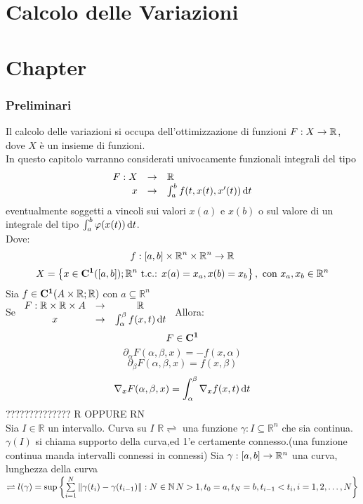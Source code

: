 \part{Calcolo delle Variazioni}
\part{Chapter}

\section{Preliminari}
Il calcolo delle variazioni si occupa dell'ottimizzazione di funzioni $F:X\to\mathbb{R}$, dove $X$ è un insieme di funzioni.\\
In questo capitolo varranno considerati univocamente funzionali integrali del tipo
$$\begin{array}{rcl} F: X & \to & \mathbb{R} \\
x & \to & \int_{a}^b f(t,x(t), x'(t))\,\mathrm{d}{t}\end{array}$$
eventualmente soggetti a vincoli sui valori $x(a)$ e $x(b)$ o sul valore di un integrale del tipo $\int_a^b \varphi(x(t))\,\mathrm{d}{t}$.\\
Dove:
$$f:\left[a,b\right]\times\mathbb{R}^n\times\mathbb{R}^n\to\mathbb{R}$$
$$X=\left\{x\in \mathbf{C^{1}}(\left[a,b\right]);\mathbb{R}^n\text{ t.c.: }x(a)=x_a, x(b)=x_b \right\},\text{ con }x_a,x_b\in\mathbb{R}^n$$
\proposition
Sia $f\in \mathbf{C^{1}}(A\times\mathbb{R};\mathbb{R})$ con $a\subseteq\mathbb{R}^n$\\
Se $\begin{array}{ccc} F: \mathbb{R}\times\mathbb{R}\times A & \to & \mathbb{R} \\
x & \to & \int_{\alpha}^\beta f(x,t)\,\mathrm{d}{t}\end{array}$
Allora:
$$ F\in \mathbf{C^{1}}$$
$$ \partial_\alpha F(\alpha,\beta,x)=-f(x,\alpha)$$
$$ \partial_\beta F(\alpha,\beta,x)=f(x,\beta)$$
$$ \nabla_x F(\alpha,\beta,x)=\int_{\alpha}^{\beta}\nabla_xf(x,t)\,\mathrm{d}{t}$$
 ?????????????? R OPPURE RN\\
Sia $I\in\mathbb{R}$ un intervallo. Curva su $I$ $\mathbb{R}\rightleftharpoons$ una funzione $\gamma:I\subseteq\mathbb{R}^n$ che sia continua.
\observation
$\gamma(I)$ si chiama supporto della curva,ed 1'e certamente connesso.(una funzione continua manda intervalli connessi in connessi)
Sia $\gamma:\left[a,b\right]\to\mathbb{R}^n$ una curva, lunghezza della curva $\rightleftharpoons l(\gamma)=\sup\left\{\sum\limits_{i=1}^{N}\left\|\gamma(t_i)-\gamma(t_{i-1})\right\|: N\in\mathbb{N}\,N>1,t_0=a,t_N=b,t_{i-1}<t_i, i=1,2,\ldots,N \right\}$ 
